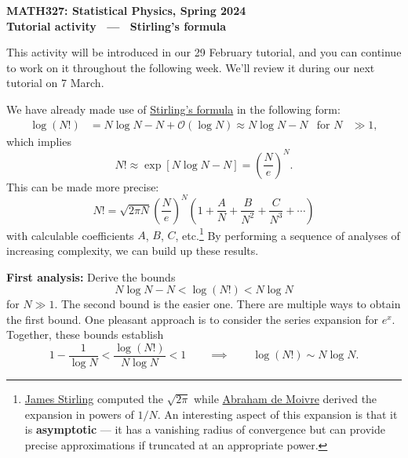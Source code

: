 \documentclass[12 pt]{article} %
\newcommand{\cO}{\ensuremath{\mathcal O} }
\begin{document}
\newcommand{\thisunit}{MATH327 Tutorial (Stirling)}
\newcommand{\moddate}{Last modified 29 Feb.~2024}
\begin{center}
  {\Large \textbf{MATH327: Statistical Physics, Spring 2024}} \\[12 pt]
  {\Large \textbf{Tutorial activity \ --- \ Stirling's formula}} \\[24 pt]
\end{center}

This activity will be introduced in our 29 February tutorial, and you can continue to work on it throughout the following week.
We'll review it during our next tutorial on 7 March.

We have already made use of \href{https://en.wikipedia.org/wiki/Stirling's_approximation}{Stirling's formula} in the following form:
\begin{align*}
  \log(N!) & = N \log N - N + \cO(\log N) \approx N \log N - N &
  \mbox{for } N & \gg 1,
\end{align*}
which implies
\begin{equation*}
  N! \approx \exp\left[N\log N - N\right] = \left(\frac{N}{e}\right)^N.
\end{equation*}
This can be made more precise:
\begin{equation}
  \label{eq:full}
  N! = \sqrt{2\pi N} \left(\frac{N}{e}\right)^N \left(1 + \frac{A}{N} + \frac{B}{N^2} + \frac{C}{N^3} + \cdots\right)
\end{equation}
with calculable coefficients $A$, $B$, $C$, etc.\footnote{\href{https://en.wikipedia.org/wiki/James_Stirling_(mathematician)}{James Stirling} computed the $\sqrt{2\pi}$ while \href{https://en.wikipedia.org/wiki/Abraham_de_Moivre}{Abraham de Moivre} derived the expansion in powers of $1 / N$.  An interesting aspect of this expansion is that it is \textbf{asymptotic} --- it has a vanishing radius of convergence but can provide precise approximations if truncated at an appropriate power.}
By performing a sequence of analyses of increasing complexity, we can build up these results.

\textbf{First analysis:} Derive the bounds
\begin{equation}
  N\log N - N < \log(N!) < N\log N
\end{equation}
for $N \gg 1$.
The second bound is the easier one.
There are multiple ways to obtain the first bound.
One pleasant approach is to consider the series expansion for $e^x$.
Together, these bounds establish
\begin{equation*}
  1 - \frac{1}{\log N} < \frac{\log(N!)}{N\log N} < 1 \qquad \implies \qquad \log(N!) \sim N\log N.
\end{equation*}
\end{document}
